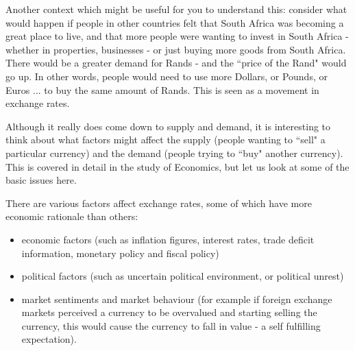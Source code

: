 \documentclass[10pt,a4paper,titlepage,twoside,openright]{report}
\begin{document}
Another context which might be useful for you to understand this: consider what would happen if people in other countries felt that South Africa was becoming a great place to live, and that more people were wanting to invest in South Africa - whether in properties, businesses - or just buying more goods from South Africa. There would be a greater demand for Rands - and the ``price of the Rand" would go up. In other words, people would need to use more Dollars, or Pounds, or Euros ... to buy the same amount of Rands. This is seen as a movement in exchange rates.

Although it really does come down to supply and demand, it is interesting to think about what factors might affect the supply (people wanting to ``sell" a particular currency) and the demand (people trying to ``buy" another currency). This is covered in detail in the study of Economics, but let us look at some of the basic issues here.

There are various factors affect exchange rates, some of which have more economic rationale than others:
\begin{itemize}[topsep=0ex, partopsep=\parskip,itemsep=\parskip]
\item{economic factors (such as inflation figures, interest rates, trade deficit information, monetary policy and fiscal policy)}
\item{political factors (such as uncertain political environment, or political unrest)}
\item{market sentiments and market behaviour (for example if foreign exchange markets perceived a currency to be overvalued and starting selling the currency, this would cause the currency to fall in value - a self fulfilling expectation).}
\end{itemize}
\end{document}
